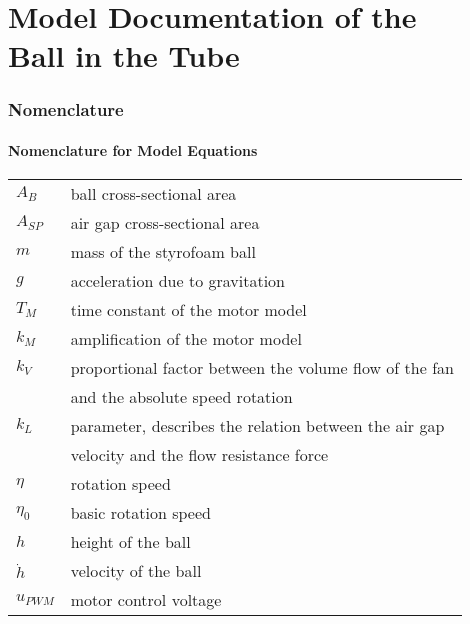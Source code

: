 \documentclass[10pt,a4paper]{article}
\begin{document}
	\part*{Model Documentation of the \\ Ball in the Tube} %
	
	
	\section{Nomenclature} %
	\subsection{Nomenclature for Model Equations} %
	
	\begin{tabular}{ll}
		$A_B$ & ball cross-sectional area \\
		$A_{SP}$ & air gap cross-sectional area \\
		$m$ & mass of the styrofoam ball \\
		$g$ & acceleration due to gravitation \\
		$T_M$ & time constant of the motor model\\
		$k_M$ & amplification of the motor model\\
		$k_V$ & proportional factor between the volume flow of the fan \\
		& and the absolute speed rotation\\
		$k_L$ & parameter, describes the relation between the air gap \\
		& velocity and the flow resistance force\\
		$\eta$ & rotation speed \\
		$\eta_0$ & basic rotation speed\\
		$h$ & height of the ball \\
		$\dot{h}$ & velocity of the ball \\
		$u_{PWM}$ & motor control voltage \\
		
				
	\end{tabular}
	 
	
	\begin{tabular}{ll}

	\end{tabular}
	
\end{document}
